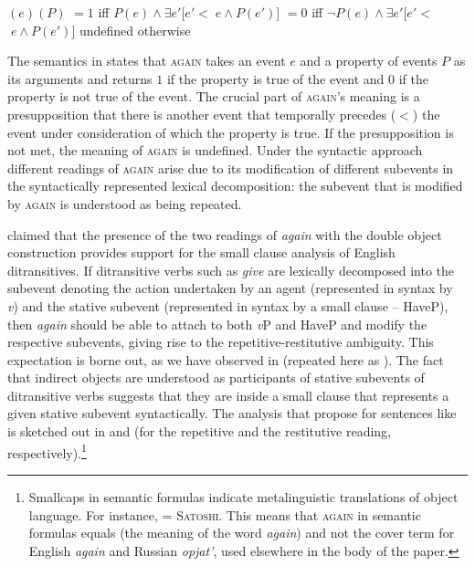 \documentclass[output=paper]{langscibook}
\begin{document}
 \ea\label{ex:bondarenko:8}
$(e)(P)$
\ea $=  1$ iff          $P(e) \wedge \exists e' [e'<$$\;e\wedge P(e')]$
\ex $= 0$ iff $\neg P(e)\wedge {\exists} e'[e'<$$\;e\wedge P(e')]$
\ex undefined otherwise
\z\z


\noindent The semantics in  states that \textsc{again} takes an event $e$ and a property of events $P$ as its arguments and returns $1$ if the property is true of the event and $0$ if the property is not true of the event. The crucial part of \textsc{again}’s meaning is a presupposition that there is another event that temporally precedes ($<$) the event under consideration of which the property is true. If the presupposition is not met, the meaning of \textsc{again} is undefined. Under the syntactic approach different readings of \textsc{again} arise due to its modification of different subevents in the syntactically represented lexical decomposition: the subevent that is modified by \textsc{again} is understood as being repeated.



\citet{Beck-Johnson2004} claimed that the presence of the two readings of \textit{again} with the double object construction provides support for the small clause analysis of English ditransitives. If ditransitive verbs such as \textit{give} are lexically decomposed into the subevent denoting the action undertaken by an agent (represented in syntax by \textit{v}) and the stative subevent (represented in syntax by a small clause – HaveP), then \textit{again} should be able to attach to both \textit{v}P and HaveP and modify the respective subevents, giving rise to the repetitive-restitutive ambiguity. This expectation is borne out, as we have observed in  (repeated here as ). The fact that indirect objects are understood as participants of stative subevents of ditransitive verbs suggests that they are inside a small clause that represents a given stative subevent syntactically. The analysis that \citet{Beck-Johnson2004} propose for sentences like  is sketched out in  and  (for the repetitive and the restitutive reading, respectively).\footnote{Smallcaps in semantic formulas indicate metalinguistic translations of object language. For instance,  = \textsc{Satoshi}. This means that \textsc{again} in semantic formulas equals  (the meaning of the word \textit{again}) and not the cover term for English \textit{again} and Russian \textit{opjat'}, used elsewhere in the body of the paper.}
\end{document}
